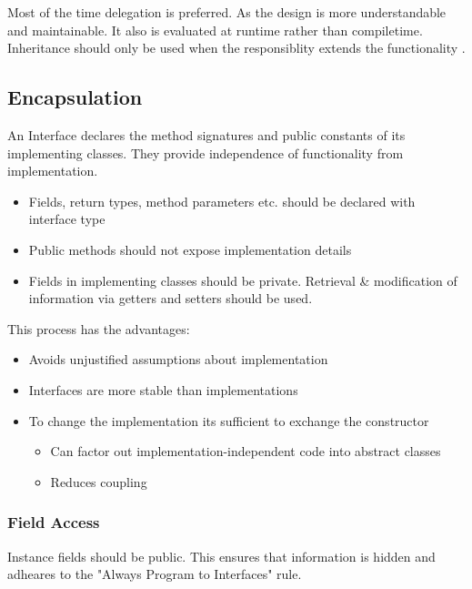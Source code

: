 \documentclass[
../../Software_Engineering_Summary.tex,
]
{subfiles}
\begin{document}
Most of the time delegation is preferred. As the design is more understandable and maintainable. It also is evaluated at runtime rather than compiletime.  Inheritance should only be used when the responsiblity extends the functionality .

\subsection{Encapsulation}

\begin{defbox}
    [Interface]
    An Interface declares the method signatures and public constants of its implementing classes. They provide independence of functionality from implementation.
\end{defbox}

\begin{defbox}
    \begin{itemize}
        \item Fields, return types, method parameters etc. should be declared with interface type
        \item Public methods should not expose implementation details
        \item Fields in implementing classes should be private. Retrieval \& modification of information via getters and setters should be used.
    \end{itemize}
\end{defbox}

This process has the advantages:
\begin{itemize}
    \item Avoids unjustified assumptions about implementation
    \item Interfaces are more stable than implementations
    \item To change the implementation its sufficient to exchange the constructor
    \begin{itemize}
        \item Can factor out implementation-independent code into abstract classes
        \item Reduces coupling
    \end{itemize}
\end{itemize}

\subsubsection{Field Access}
Instance fields should  be public. This ensures that information is hidden and adheares to the "Always Program to Interfaces" rule. 
\end{document}
